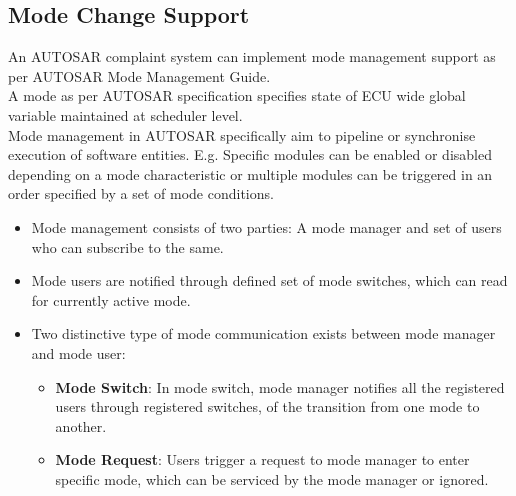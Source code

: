\subsection{Mode Change Support}
An AUTOSAR complaint system can implement mode management support as per AUTOSAR Mode Management Guide.\\
A mode as per AUTOSAR specification specifies state of ECU wide global variable maintained at scheduler level.\\
Mode management in AUTOSAR specifically aim to pipeline or synchronise execution of software entities. E.g. Specific modules can be enabled or disabled depending on a mode characteristic or multiple modules can be triggered in an order specified by a set of mode conditions.\\
\begin{itemize}
	\item Mode management consists of two parties: A mode manager and set of users who can subscribe to the same.
	\item Mode users are notified through defined set of mode switches, which can read for currently active mode.	
	\item Two distinctive type of mode communication exists between mode manager and mode user:
	\begin{itemize}
		\item \textbf{Mode Switch}: In mode switch, mode manager notifies all the registered users through registered switches, of the transition from one mode to another.
		\item \textbf{Mode Request}: Users trigger a request to mode manager to enter specific mode, which can be serviced by the mode manager or ignored.
	\end{itemize}
\end{itemize} 
